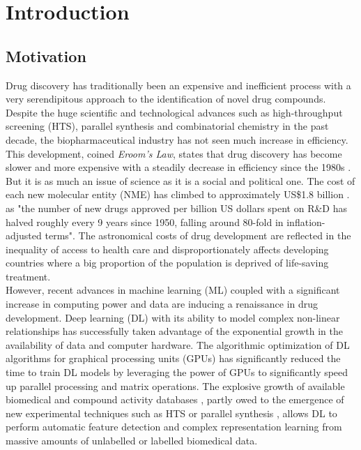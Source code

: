 \documentclass[bsc,frontabs,twoside,singlespacing,parskip,deptreport]{infthesis}     %
\let\Oldsection\section
\renewcommand{\section}{\FloatBarrier\Oldsection}
\begin{document}
\tableofcontents



\chapter{Introduction}

\section{Motivation}
Drug discovery has traditionally been an expensive and inefficient process with a very serendipitous approach to the identification of novel drug compounds.
Despite the huge scientific and technological advances such as high-throughput screening (HTS), parallel synthesis and combinatorial chemistry in the past decade, the biopharmaceutical industry has not seen much increase in efficiency. This development, coined \textit{Eroom's Law}, states that drug discovery has become slower and more expensive with a steadily decrease in efficiency since the 1980s \cite{scannell_diagnosing_2012}. But it is as much an issue of science as it is a social and political one. The cost of each new molecular entity (NME) has climbed to approximately US\$1.8 billion \cite{paul_how_2010}. as "the number of new drugs approved per billion US dollars spent on R\&D has halved roughly every 9 years since 1950, falling around 80-fold in inflation-adjusted terms"\cite{scannell_diagnosing_2012}.
The astronomical costs of drug development are reflected in the inequality of access to health care and disproportionately affects developing countries where a big proportion of the population is deprived of life-saving treatment. \\
However, recent advances in machine learning (ML) coupled with a significant increase in computing power and data are inducing a renaissance in drug development.
Deep learning (DL) \cite{lecun_deep_2015} with its ability to model complex non-linear relationships has successfully taken advantage of the exponential growth in the availability of data and computer hardware. The algorithmic optimization of DL algorithms for graphical processing units (GPUs) has significantly reduced the time to train DL models by leveraging the power of GPUs to significantly speed up parallel processing and matrix operations.
The explosive growth of available biomedical and compound activity databases \cite{papadatos_activity_2015}\cite{kim_pubchem_2016}\cite{gaulton_chembl_2012}, partly owed to the emergence of new experimental techniques such as HTS or parallel synthesis \cite{grada_next-generation_2013}, allows DL to perform automatic feature detection and complex representation learning from massive amounts of unlabelled or labelled biomedical data.\\
\end{document}
